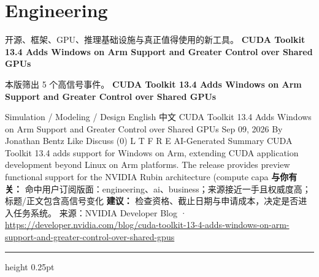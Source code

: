 \documentclass[10.5pt]{ctexart}
\begin{document}
\section*{Engineering}
{\color{ormuted} 开源、框架、GPU、推理基础设施与真正值得使用的新工具。}
\vspace{2mm}
{\LARGE\bfseries CUDA Toolkit 13.4 Adds Windows on Arm Support and Greater Control over Shared GPUs}\par
\vspace{1mm}
{\color{ormuted} 本版筛出 5 个高信号事件。}
\vspace{3mm}
{\Large\bfseries CUDA Toolkit 13.4 Adds Windows on Arm Support and Greater Control over Shared GPUs}\par
Simulation / Modeling / Design English 中文 CUDA Toolkit 13.4 Adds Windows on Arm Support and Greater Control over Shared GPUs Sep 09, 2026 By Jonathan Bentz Like Discuss (0) L T F R E AI-Generated Summary CUDA Toolkit 13.4 adds support for Windows on Arm, extending CUDA application development beyond Linux on Arm platforms. The release provides preview functional support for the NVIDIA Rubin architecture (compute capa
\textbf{与你有关：} 命中用户订阅版面：engineering、ai、business；来源接近一手且权威度高；标题/正文包含高信号变化
\textbf{建议：} 检查资格、截止日期与申请成本，决定是否进入任务系统。
{\footnotesize\color{ormuted} 来源：NVIDIA Developer Blog · \url{https://developer.nvidia.com/blog/cuda-toolkit-13-4-adds-windows-on-arm-support-and-greater-control-over-shared-gpus}}
\vspace{4mm}
\hrule height 0.25pt
\vspace{3mm}
\end{document}
